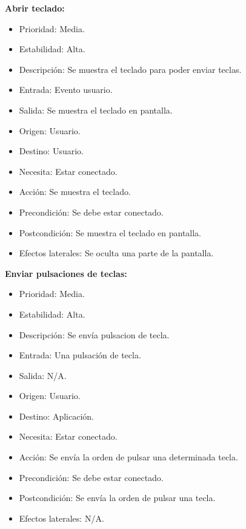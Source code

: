 \textbf{Abrir teclado:}
\begin{itemize}
\item Prioridad: Media.
\item Estabilidad: Alta.
\item Descripción: Se muestra el teclado para poder enviar teclas.
\item Entrada: Evento usuario.
\item Salida: Se muestra el teclado en pantalla.
\item Origen: Usuario.
\item Destino: Usuario.
\item Necesita: Estar conectado.
\item Acción: Se muestra el teclado.
\item Precondición: Se debe estar conectado.
\item Postcondición: Se muestra el teclado en pantalla.
\item Efectos laterales: Se oculta una parte de la pantalla.\\

\end{itemize}
\newpage
\textbf{Enviar pulsaciones de teclas:}
\begin{itemize}
\item Prioridad: Media.
\item Estabilidad: Alta.
\item Descripción: Se envía pulsacion de tecla.
\item Entrada: Una pulsación de tecla.
\item Salida: N/A.
\item Origen: Usuario.
\item Destino: Aplicación.
\item Necesita: Estar conectado.
\item Acción: Se envía la orden de pulsar una determinada tecla.
\item Precondición: Se debe estar conectado.
\item Postcondición: Se envía la orden de pulsar una tecla.
\item Efectos laterales: N/A.\\

\end{itemize}

